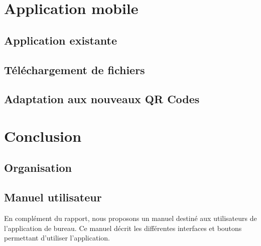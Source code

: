 \documentclass{report}
\begin{document}
\chapter{Application mobile}

	\section{Application existante}
		
		
	\section{Téléchargement de fichiers}
		

	\section{Adaptation aux nouveaux QR Codes}
		

\chapter{Conclusion}
	



\addappheadtotoc
\appendixpage

\appendix

\section{Organisation}

	 \label{organisation}
				

\section{Manuel utilisateur} \label{manuel}
\par En complément du rapport, nous proposons un manuel destiné aux utilisateurs de l'application de bureau. Ce manuel décrit les différentes interfaces et boutons permettant d'utiliser l'application.

	
\end{document}
